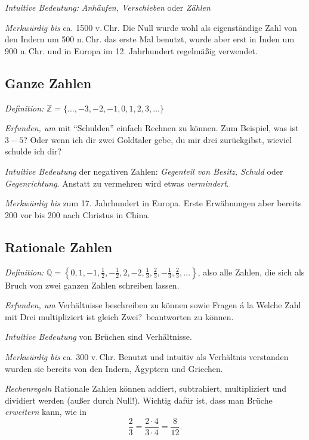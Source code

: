 \documentclass{zirkelblatt1415}
\newcommand{\ZZ}{\mathbb{Z}}
\newcommand{\QQ}{\mathbb{Q}}
\begin{document}
\emph{Intuitive Bedeutung:} \emph{Anhäufen, Verschieben} oder \emph{Zählen}

\emph{Merkwürdig bis} ca. 1500 v.\,Chr. Die Null wurde wohl als eigenständige Zahl von den Indern um 500 n.\,Chr. das erste Mal benutzt, wurde aber erst in Inden um 900 n.\,Chr. und in Europa im 12. Jahrhundert regelmäßig verwendet.


\subsection{Ganze Zahlen}

\emph{Definition:} $\ZZ=\{\ldots,-3,-2,-1,0,1,2,3,\ldots\}$

\emph{Erfunden, um} mit "`Schulden"' einfach Rechnen zu können. Zum Beispiel, was ist $3-5$? Oder wenn ich dir zwei Goldtaler gebe, du mir drei zurückgibst, wieviel schulde ich dir?

\emph{Intuitive Bedeutung} der negativen Zahlen: \emph{Gegenteil von Besitz, Schuld} oder \emph{Gegenrichtung}. Anstatt zu vermehren wird etwas \emph{vermindert}.

\emph{Merkwürdig bis} zum 17. Jahrhundert in Europa. Erste Erwähnungen aber bereits 200 vor bis 200 nach Christus in China.


\subsection{Rationale Zahlen}

\emph{Definition:} $\QQ=\left\{0,1,-1,\frac{1}{2},-\frac{1}{2},2,-2,\frac{1}{3},\frac{2}{3},-\frac{1}{3},\frac{2}{3},\ldots\right\}$, also alle Zahlen, die sich als Bruch von zwei ganzen Zahlen schreiben lassen.

\emph{Erfunden, um} Verhältnisse beschreiben zu können sowie Fragen \'a la \glqq Welche Zahl mit Drei multipliziert ist gleich Zwei?\grqq\ beantworten zu können.

\emph{Intuitive Bedeutung} von Brüchen sind Verhältnisse.

\emph{Merkwürdig bis} ca. 300 v.\,Chr. Benutzt und intuitiv als Verhältnis verstanden wurden sie bereits von den Indern, Ägyptern und Griechen.

\emph{Rechenregeln} Rationale Zahlen können addiert, subtrahiert, multipliziert und dividiert werden (außer durch Null!). Wichtig dafür ist, dass man Brüche \emph{erweitern} kann, wie in
\begin{equation*}
  \frac{2}{3}=\frac{2\cdot 4}{3\cdot 4}=\frac{8}{12}.
\end{equation*}
\end{document}
